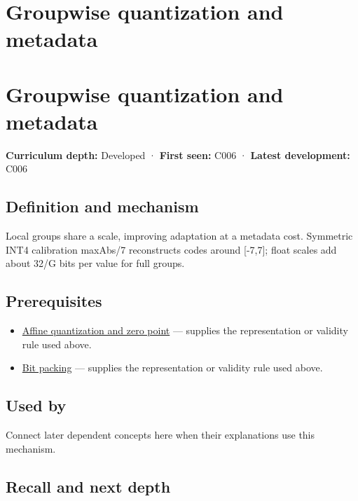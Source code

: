 \hypertarget{appendix-638204c40e8b}{}
\section*{Groupwise quantization and metadata}
\section{Groupwise quantization and metadata}\label{appendix-638204c40e8b-groupwise-quantization-and-metadata}

\textbf{Curriculum depth:} Developed · \textbf{First seen:} C006 · \textbf{Latest development:} C006

\subsection{Definition and mechanism}\label{appendix-638204c40e8b-definition-and-mechanism}

Local groups share a scale, improving adaptation at a metadata cost. Symmetric INT4 calibration maxAbs/7 reconstructs codes around {[}-7,7{]}; float scales add about 32/G bits per value for full groups.

\subsection{Prerequisites}\label{appendix-638204c40e8b-prerequisites}

\begin{itemize}
\tightlist
\item
  \hyperref[appendix-d5da3eaabaef]{Affine quantization and zero point} --- supplies the representation or validity rule used above.
\item
  \hyperref[appendix-1f9963e1a5d1]{Bit packing} --- supplies the representation or validity rule used above.
\end{itemize}

\subsection{Used by}\label{appendix-638204c40e8b-used-by}

Connect later dependent concepts here when their explanations use this mechanism.

\subsection{Recall and next depth}\label{appendix-638204c40e8b-recall-and-next-depth}


